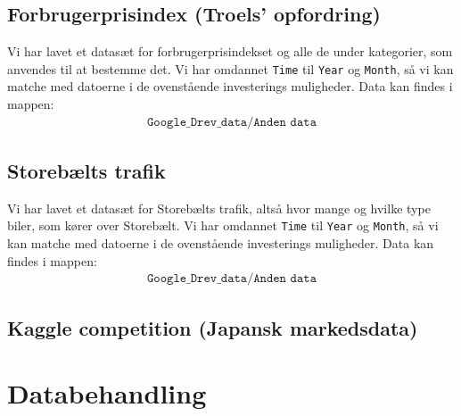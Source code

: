 \documentclass[a4paper,danish,12pt]{article}
\begin{document}
\subsection*{Forbrugerprisindex (Troels' opfordring)}

Vi har lavet et datasæt for forbrugerprisindekset og alle de under kategorier, som anvendes til at bestemme det. Vi har omdannet \texttt{Time} til \texttt{Year} og \texttt{Month}, så vi kan matche med datoerne i de ovenstående investerings muligheder. Data kan findes i mappen:
\begin{align*}
	\texttt{Google\_Drev\_data/Anden data}
\end{align*}

\subsection*{Storebælts trafik}

Vi har lavet et datasæt for Storebælts trafik, altså hvor mange og hvilke type biler, som kører over Storebælt. Vi har omdannet \texttt{Time} til \texttt{Year} og \texttt{Month}, så vi kan matche med datoerne i de ovenstående investerings muligheder. Data kan findes i mappen:
\begin{align*}
\texttt{Google\_Drev\_data/Anden data}
\end{align*}

\subsection*{Kaggle competition (Japansk markedsdata)}


\section{Databehandling}
\end{document}
